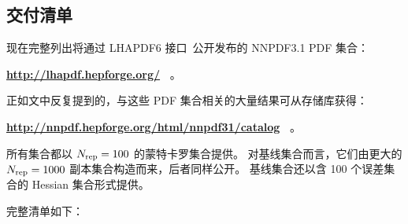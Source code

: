 \clearpage



\subsection{交付清单}
\label{sec:delivery}

现在完整列出将通过 {\sc\small LHAPDF6}
接口~\cite{Buckley:2014ana}公开发布的 NNPDF3.1 PDF 集合：
\begin{center}
{\bf \url{http://lhapdf.hepforge.org/}~} 。
\end{center}
正如文中反复提到的，与这些 PDF 集合相关的大量结果可从存储库获得：
\begin{center}
{\bf \url{http://nnpdf.hepforge.org/html/nnpdf31/catalog}~} 。
\end{center}
所有集合都以 $N_{\rm rep}=100$ 的蒙特卡罗集合提供。
对基线集合而言，它们由更大的 $N_{\rm rep}=1000$ 副本集合构造而来，后者同样公开。
基线集合还以含 100 个误差集合的 Hessian 集合形式提供。

完整清单如下：

